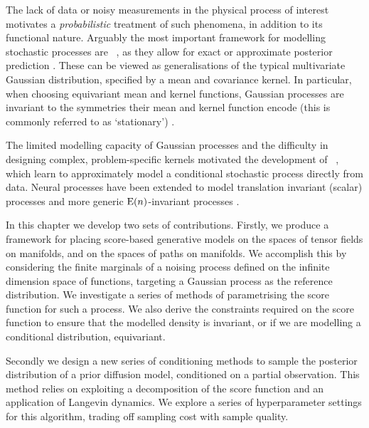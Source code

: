 The lack of data or noisy measurements in the physical process of interest motivates a \emph{probabilistic} treatment of such phenomena, in addition to its functional nature.
Arguably the most important framework for modelling stochastic processes are  ~\parencite{rasmussen2003gaussian}, as they allow for exact or approximate posterior prediction \parencite{titsias2009Variational,rahimi2007random,wilson2020efficiently}.
These can be viewed as generalisations of the typical multivariate Gaussian distribution, specified by a mean and covariance kernel.
In particular, when choosing equivariant mean and kernel functions, Gaussian processes are invariant to the symmetries their mean and kernel function encode (this is commonly referred to as `stationary') \parencite{terenin22, holderrieth2021equivariant, azangulov2023stationary, azangulov2023stationary2}.

The limited modelling capacity of Gaussian processes and the difficulty in designing complex, problem-specific kernels motivated the development of ~\cite{garnelo2018neural}, which learn to approximately model a conditional stochastic process directly from data.
Neural processes have been extended to model translation invariant (scalar) processes \parencite{gordon2019Convolutional} and more generic \(\mathrm{E}(n){}\)-invariant processes \parencite{holderrieth2021equivariant}.

In this chapter we develop two sets of contributions.
Firstly, we produce a framework for placing score-based generative models on the spaces of tensor fields on manifolds, and on the spaces of paths on manifolds.
We accomplish this by considering the finite marginals of a noising process defined on the infinite dimension space of functions, targeting a Gaussian process as the reference distribution.
We investigate a series of methods of parametrising the score function for such a process.
We also derive the constraints required on the score function to ensure that the modelled density is invariant, or if we are modelling a conditional distribution, equivariant.

Secondly we design a new series of conditioning methods to sample the posterior distribution of a prior diffusion model, conditioned on a partial observation.
This method relies on exploiting a decomposition of the score function and an application of Langevin dynamics.
We explore a series of hyperparameter settings for this algorithm, trading off sampling cost with sample quality.

